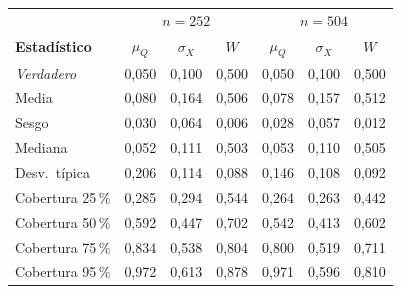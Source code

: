 {\footnotesize
\renewcommand{\arraystretch}{1.18}
\begin{tabular}{l|ccc|ccc}
\hline
\multicolumn{1}{c}{} & \multicolumn{3}{c}{$n=252$} & \multicolumn{3}{c}{$n=504$} \\
\textbf{Estad\'istico} & $\mu_Q$ & $\sigma_X$ & $W$ & $\mu_Q$ & $\sigma_X$ & $W$ \\
\hline
\textit{Verdadero} & 0,050 & 0,100 & 0,500 & 0,050 & 0,100 & 0,500 \\
\hline
Media & 0,080 & 0,164 & 0,506 & 0,078 & 0,157 & 0,512 \\
Sesgo & 0,030 & 0,064 & 0,006 & 0,028 & 0,057 & 0,012 \\
Mediana & 0,052 & 0,111 & 0,503 & 0,053 & 0,110 & 0,505 \\
Desv.\ t\'ipica & 0,206 & 0,114 & 0,088 & 0,146 & 0,108 & 0,092 \\
\hline
Cobertura 25\,\% & 0,285 & 0,294 & 0,544 & 0,264 & 0,263 & 0,442 \\
Cobertura 50\,\% & 0,592 & 0,447 & 0,702 & 0,542 & 0,413 & 0,602 \\
Cobertura 75\,\% & 0,834 & 0,538 & 0,804 & 0,800 & 0,519 & 0,711 \\
Cobertura 95\,\% & 0,972 & 0,613 & 0,878 & 0,971 & 0,596 & 0,810 \\
\hline
\end{tabular}}